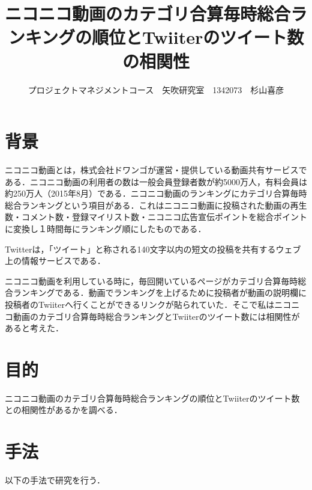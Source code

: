 \documentclass[uplatex,twocolumn,dvipdfmx]{jsarticle}
\title{\vspace{-5mm}\fontsize{14pt}{0pt}\selectfont ニコニコ動画のカテゴリ合算毎時総合ランキングの順位とTwiiterのツイート数の相関性}
\author{\normalsize プロジェクトマネジメントコース　矢吹研究室　1342073　杉山喜彦}
\date{}
\begin{document}
\fontsize{10.5pt}{\baselineskip}\selectfont
\maketitle





\section{背景}


ニコニコ動画とは，株式会社ドワンゴが運営・提供している動画共有サービスである．ニコニコ動画の利用者の数は一般会員登録者数が約5000万人，有料会員は約250万人（2015年8月）である\cite{iii}．ニコニコ動画のランキングにカテゴリ合算毎時総合ランキングという項目がある．これはニコニコ動画に投稿された動画の再生数・コメント数・登録マイリスト数・ニコニコ広告宣伝ポイントを総合ポイントに変換し１時間毎にランキング順にしたものである．

Twitterは，「ツイート」と称される140文字以内の短文の投稿を共有するウェブ上の情報サービスである．

ニコニコ動画を利用している時に，毎回開いているページがカテゴリ合算毎時総合ランキングである．動画でランキングを上げるために投稿者が動画の説明欄に投稿者のTwiiterへ行くことができるリンクが貼られていた．そこで私はニコニコ動画のカテゴリ合算毎時総合ランキングとTwiiterのツイート数には相関性があると考えた．


\noindent



\section{目的}
ニコニコ動画のカテゴリ合算毎時総合ランキングの順位とTwiiterのツイート数との相関性があるかを調べる．

\section{手法}

以下の手法で研究を行う．
\end{document}
